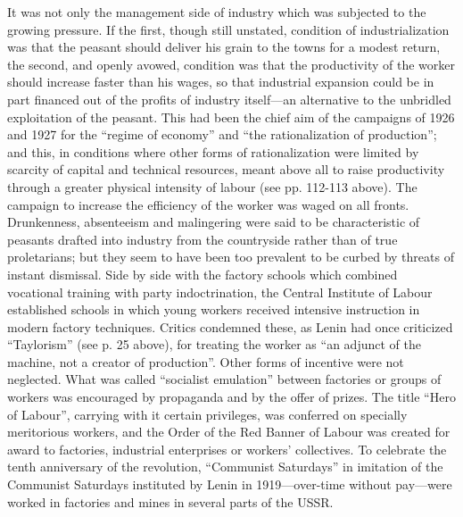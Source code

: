 It was not only the management side of industry which was subjected to the growing pressure. If the first, though still unstated, condition of industrialization was that the peasant should deliver his grain to the towns for a modest return, the second, and openly avowed, condition was that the productivity of the worker should increase faster than his wages, so that industrial expansion could be in part financed out of the profits of industry itself---an alternative to the unbridled exploitation of the peasant. This had been the chief aim of the campaigns of 1926 and 1927 for the ``regime of economy'' and ``the rationalization of production''; and this, in conditions where other forms of rationalization were limited by scarcity of capital and technical resources, meant above all to raise productivity through a greater physical intensity of labour (see pp. 112-113 above). The campaign to increase the efficiency of the worker was waged on all fronts. Drunkenness, absenteeism and malingering were said to be characteristic of peasants drafted into industry from the countryside rather than of true proletarians; but they seem to have been too prevalent to be curbed by threats of instant dismissal. Side by side with the factory schools which combined vocational training with party indoctrination, the Central Institute of Labour established schools in which young workers received intensive instruction in modern factory techniques. Critics condemned these, as Lenin had once criticized ``Taylorism'' (see p. 25 above), for treating the worker as ``an adjunct of the machine, not a creator of production''. Other forms of incentive were not neglected. What was called ``socialist emulation'' between factories or groups of workers was encouraged by propaganda and by the offer of prizes. The title ``Hero of Labour'', carrying with it certain privileges, was conferred on specially meritorious workers, and the Order of the Red Banner of Labour was created for award to factories, industrial enterprises or workers' collectives. To celebrate the tenth anniversary of the revolution, ``Communist Saturdays'' in imitation of the Communist Saturdays instituted by Lenin in 1919---over-time without pay---were worked in factories and mines in several parts of the USSR. 

